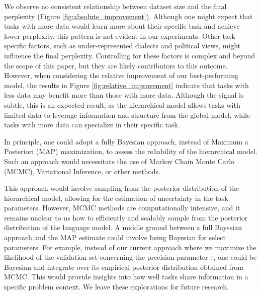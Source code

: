 \documentclass[fullpaper]{nldl}
\begin{document}
We observe no consistent relationship between dataset size and the final perplexity (Figure \ref{fig:absolute_improvement}). Although one might expect that tasks with more data would learn more about their specific task and achieve lower perplexity, this pattern is not evident in our experiments. Other task-specific factors, such as under-represented dialects and political views, might influence the final perplexity. Controlling for these factors is complex and beyond the scope of this paper, but they are likely contributors to this outcome.
However, when considering the relative improvement of our best-performing model, the results in Figure \ref{fig:relative_improvement} indicate that tasks with less data may benefit more than those with more data. Although the signal is subtle, this is an expected result, as the hierarchical model allows tasks with limited data to leverage information and structure from the global model, while tasks with more data can specialize in their specific task.

In principle, one could adopt a fully Bayesian approach, instead of Maximum a Posteriori (MAP) maximization, to assess the reliability of the hierarchical model. Such an approach would necessitate the use of Markov Chain Monte Carlo (MCMC), Variational Inference, or other methods.

This approach would involve sampling from the posterior distribution of the hierarchical model, allowing for the estimation of uncertainty in the task parameters. However, MCMC methods are computationally intensive, and it remains unclear to us how to efficiently and scalably sample from the posterior distribution of the language model.
A middle ground between a full Bayesian approach and the MAP estimate could involve being Bayesian for select parameters. For example, instead of our current approach where we maximize the likelihood of the validation set concerning the precision parameter $\tau$, one could be Bayesian and integrate over its empirical posterior distribution obtained from MCMC. This would provide insights into how well tasks share information in a specific problem context.
We leave these explorations for future research.
\end{document}
